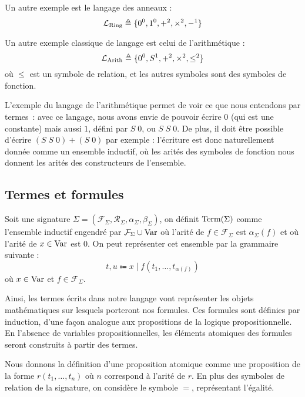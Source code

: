 \begin{example}
  Un autre exemple est le langage des anneaux :
  \[\mathcal L_{\mathrm{Ring}}\triangleq \{0^0,1^0,+^2,\times^2,-^1\}\]
\end{example}

\begin{example}
  Un autre exemple classique de langage est celui de l'arithmétique :
  \[\mathcal L_{\mathrm{Arith}}\triangleq \{0^0, S^1, +^2,\times^2,\leq^2\}\]
  où $\leq$ est un symbole de relation, et les autres symboles sont des symboles
  de fonction.
\end{example}

L'exemple du langage de l'arithmétique permet de voir ce que nous entendons par
termes~: avec ce langage, nous avons envie de pouvoir écrire $0$ (qui est une
constante) mais aussi $1$, défini par $S\;0$, ou $S\;S\;0$. De plus, il doit
être possible d'écrire $(S\;S\;0) + (S\;0)$ par exemple : l'écriture est donc
naturellement donnée comme un ensemble inductif, où les arités des symboles de
fonction nous donnent les arités des constructeurs de l'ensemble.

\subsection{Termes et formules}

\begin{definition}[Termes]
  Soit une signature
  $\Sigma = (\mathcal F_\Sigma,\mathcal R_\Sigma, \alpha_\Sigma,\beta_\Sigma)$,
  on définit $\operatorname{Term}(\Sigma)$ comme l'ensemble inductif engendré par
  $\mathcal F_\Sigma\cup\operatorname{Var}$ où l'arité de $f\in\mathcal F_\Sigma$ est
  $\alpha_\Sigma(f)$ et où l'arité de $x\in \operatorname{Var}$ est $0$. On peut représenter
  cet ensemble par la grammaire suivante :
  \[t,u \Coloneq x \mid f(t_1,\ldots,t_{\alpha(f)})\]
  où $x\in \operatorname{Var}$ et $f\in \mathcal F_\Sigma$.
\end{definition}

Ainsi, les termes écrits dans notre langage vont représenter les objets
mathématiques sur lesquels porteront nos formules. Ces formules sont définies
par induction, d'une façon analogue aux propositions de la logique
propositionnelle. En l'absence de variables propositionnelles, les éléments
atomiques des formules seront construits à partir des termes.

Nous donnons la définition d'une proposition atomique comme une proposition de
la forme $r(t_1,\ldots,t_n)$ où $n$ correspond à l'arité de $r$. En plus des
symboles de relation de la signature, on considère le symbole $=$, représentant
l'égalité.

